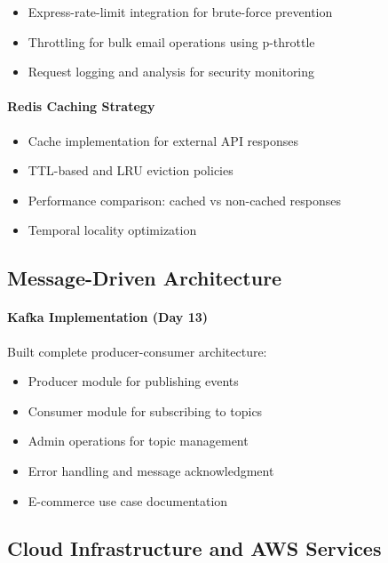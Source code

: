\begin{itemize}
    \item Express-rate-limit integration for brute-force prevention
    \item Throttling for bulk email operations using p-throttle
    \item Request logging and analysis for security monitoring
\end{itemize}

\paragraph{Redis Caching Strategy}

\begin{itemize}
    \item Cache implementation for external API responses
    \item TTL-based and LRU eviction policies
    \item Performance comparison: cached vs non-cached responses
    \item Temporal locality optimization
\end{itemize}

\subsection{Message-Driven Architecture}

\paragraph{Kafka Implementation (Day 13)}

Built complete producer-consumer architecture:
\begin{itemize}
    \item Producer module for publishing events
    \item Consumer module for subscribing to topics
    \item Admin operations for topic management
    \item Error handling and message acknowledgment
    \item E-commerce use case documentation
\end{itemize}

\subsection{Cloud Infrastructure and AWS Services}

